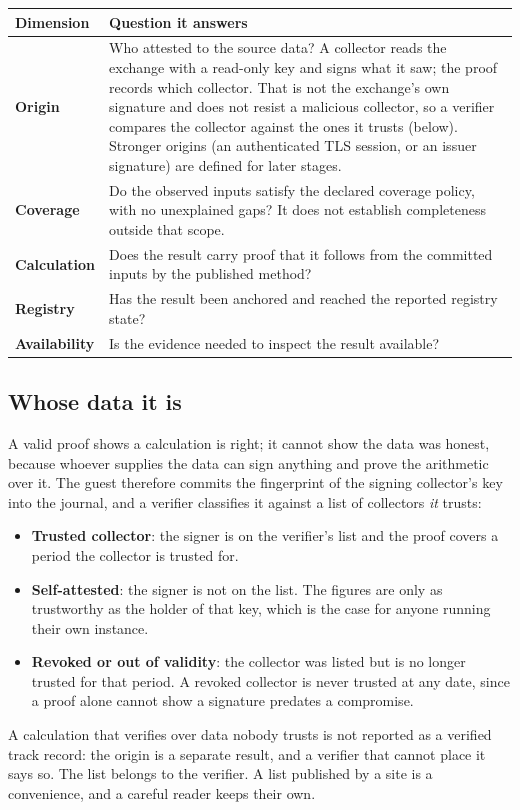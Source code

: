 \documentclass[11pt,a4paper]{article}
\begin{document}
\begin{center}
\small
\begin{tabularx}{\linewidth}{@{}>{\sffamily\bfseries}p{2.2cm}X@{}}
\toprule
Dimension & Question it answers\\
\midrule
Origin & Who attested to the source data? A collector reads the exchange with a read-only key and signs what it saw; the proof records which collector. That is not the exchange's own signature and does not resist a malicious collector, so a verifier compares the collector against the ones it trusts (below). Stronger origins (an authenticated TLS session, or an issuer signature) are defined for later stages.\\
Coverage & Do the observed inputs satisfy the declared coverage policy, with no unexplained gaps? It does not establish completeness outside that scope.\\
Calculation & Does the result carry proof that it follows from the committed inputs by the published method?\\
Registry & Has the result been anchored and reached the reported registry state?\\
Availability & Is the evidence needed to inspect the result available?\\
\bottomrule
\end{tabularx}
\end{center}

\subsection*{Whose data it is}
A valid proof shows a calculation is right; it cannot show the data was honest, because whoever supplies the data can sign anything and prove the arithmetic over it. The guest therefore commits the fingerprint of the signing collector's key into the journal, and a verifier classifies it against a list of collectors \emph{it} trusts:
\begin{itemize}[leftmargin=1.2em,itemsep=0.2em]
\item \textbf{Trusted collector}: the signer is on the verifier's list and the proof covers a period the collector is trusted for.
\item \textbf{Self-attested}: the signer is not on the list. The figures are only as trustworthy as the holder of that key, which is the case for anyone running their own instance.
\item \textbf{Revoked or out of validity}: the collector was listed but is no longer trusted for that period. A revoked collector is never trusted at any date, since a proof alone cannot show a signature predates a compromise.
\end{itemize}
A calculation that verifies over data nobody trusts is not reported as a verified track record: the origin is a separate result, and a verifier that cannot place it says so. The list belongs to the verifier. A list published by a site is a convenience, and a careful reader keeps their own.
\end{document}
